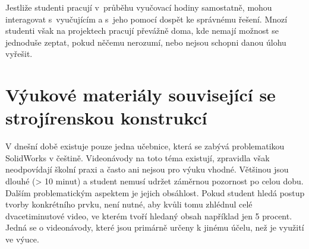     Jestliže studenti pracují v~průběhu vyučovací hodiny samostatně, mohou interagovat s~vyučujícím a s~jeho pomocí dospět ke správnému řešení.
    Mnozí studenti však na projektech pracují převážně doma, kde nemají možnost se jednoduše zeptat, pokud něčemu nerozumí, nebo nejsou schopni danou úlohu vyřešit.

\section{Výukové materiály související se strojírenskou konstrukcí}
    V dnešní době existuje pouze jedna učebnice, která se zabývá problematikou SolidWorks v češtině.
    Videonávody na toto téma existují, zpravidla však neodpovídají školní praxi a často ani nejsou pro výuku vhodné.
    Většinou jsou dlouhé (> 10 minut) a student nemusí udržet záměrnou pozornost po celou dobu.
    Dalším problematickým aspektem je jejich obsáhlost.
    Pokud student hledá postup tvorby konkrétního prvku, není nutné, aby kvůli tomu zhlédnul celé dvacetiminutové video, ve kterém tvoří hledaný obsah například jen 5 procent. 
    Jedná se o videonávody, které jsou primárně určeny k jinému účelu, než je využití ve výuce. 
